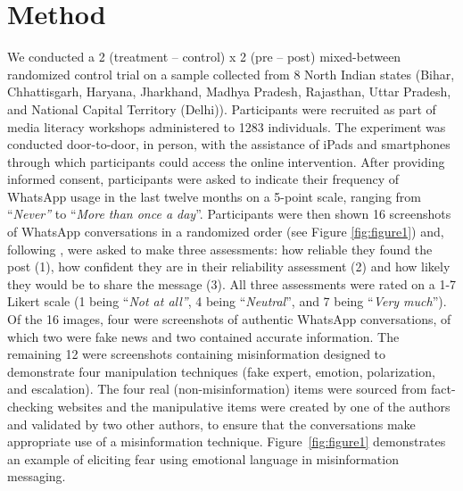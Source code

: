 \documentclass[empirical, authordate, issue]{jote-new-article}
\begin{document}
\section{Method}

We conducted a 2 (treatment -- control) x 2 (pre -- post) mixed-between randomized control trial on a sample collected from 8 North Indian states (Bihar, Chhattisgarh, Haryana, Jharkhand, Madhya Pradesh, Rajasthan, Uttar Pradesh, and National Capital Territory (Delhi)). Participants were recruited as part of media literacy workshops administered to 1283 individuals. The experiment was conducted door-to-door, in person, with the assistance of iPads and smartphones through which participants could access the online intervention. After providing informed consent, participants were asked to indicate their frequency of \mbox{WhatsApp} usage in the last twelve months on a 5-point scale, ranging from “\emph{Never”} to “\emph{More than once a day}”. Participants were then shown 16 screenshots of \mbox{WhatsApp} conversations in a randomized order (see Figure \ref{fig:figure1}) and, following \textcite{Roozenbeek2021}, were asked to make three assessments: how reliable they found the post (1), how confident they are in their reliability assessment (2) and how likely they would be to share the message (3). All three assessments were rated on a 1-7 Likert scale (1 being “\emph{Not at all”}, 4 being “\emph{Neutral}”, and 7 being “\emph{Very much}”). Of the 16 images, four were screenshots of authentic \mbox{WhatsApp} conversations, of which two were fake news and two contained accurate information. The remaining 12 were screenshots containing misinformation designed to demonstrate four manipulation techniques (fake expert, emotion, polarization, and escalation). The four real (non-misinformation) items were sourced from fact-checking websites and the manipulative items were created by one of the authors and validated by two other authors, to ensure that the conversations make appropriate use of a misinformation technique. Figure~\ref{fig:figure1} demonstrates an example of eliciting fear using emotional language in misinformation messaging.
\end{document}
